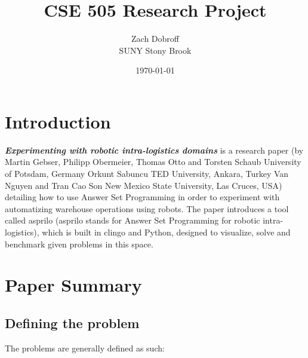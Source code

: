 \documentclass[12pt]{article}
\begin{document}
\title{CSE 505 Research Project}
\author{Zach Dobroff\\
SUNY Stony Brook}
\date{\today}
\maketitle

\section*{Introduction}

\textbf{\textit{Experimenting with robotic intra-logistics domains}} is a research paper (by Martin Gebser, Philipp Obermeier, Thomas Otto and Torsten Schaub University of Potsdam, Germany Orkunt Sabuncu TED University, Ankara, Turkey Van Nguyen and Tran Cao Son New Mexico State University, Las Cruces, USA) detailing how to use Answer Set Programming in order to experiment with automatizing warehouse operations using robots. The paper introduces a tool called asprilo (asprilo stands for Answer Set Programming for robotic intra-logistics), which is built in clingo and Python, designed to visualize, solve and benchmark given problems in this space.

\section*{Paper Summary}

\subsection*{Defining the problem}

The problems are generally defined as such:
\end{document}
